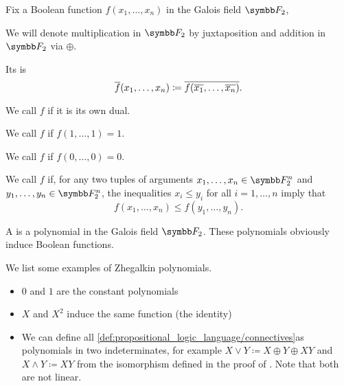 \begin{definition}\label{def:boolean_functions_in_f2}
  Fix a Boolean function \( f(x_1, \ldots, x_n) \) in the Galois field \( \BF_2 \),

  We will denote multiplication in \( \BF_2 \) by juxtaposition and addition in \( \BF_2 \) via \( \oplus \).

  \begin{defenum}
     Its  is
    \begin{equation*}
       \overline{f}(x_1, \ldots, x_n) \coloneqq \overline{f(\overline{x_1}, \ldots, \overline{x_n})}.
    \end{equation*}

     We call \( f \)  if it is its own dual.

     We call \( f \) if \( f(1, \ldots, 1) = 1 \).

     We call \( f \) if \( f(0, \ldots, 0) = 0 \).

     We call \( f \)  if, for any two tuples of arguments \( x_1, \ldots, x_n \in \BF_2^n \) and \( y_1, \ldots, y_n \in \BF_2^n \), the inequalities \( x_i \leq y_i \) for all \( i = 1, \ldots, n \) imply that
    \begin{equation*}
      f(x_1, \ldots, x_n) \leq f(y_1, \ldots, y_n).
    \end{equation*}
  \end{defenum}
\end{definition}

\begin{definition}\label{def:zhegalkin_polynomial}
  A  is a polynomial in the Galois field \( \BF_2 \). These polynomials obviously induce Boolean functions.
\end{definition}

\begin{example}\label{ex:zhegalkin_polynomials}
  We list some examples of Zhegalkin polynomials.

  \begin{itemize}
    \item \( 0 \) and \( 1 \) are the constant polynomials
    \item \( X \) and \( X^2 \) induce the same function (the identity)
    \item We can define all \ref{def:propositional_logic_language/connectives}as polynomials in two indeterminates, for example \( X \lor Y \coloneqq X \oplus Y \oplus XY \) and \( X \land Y \coloneqq XY \) from the isomorphism defined in the proof of . Note that both are not linear.
  \end{itemize}
\end{example}

